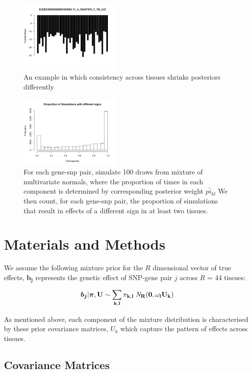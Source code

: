 \documentclass[10pt,letterpaper]{article}
\begin{document}
 \begin{figure}
\includegraphics[width=5cm]{consistent.png}
\caption{An example in which consistency across tissues shrinks posteriors differently}
\end{figure}

 \begin{figure}
\includegraphics[width=5cm]{heterogeneity distribution-1.png}
\caption{For each gene-snp pair, simulate 100 draws from mixture of multivariate normals, where the proportion of times in each component is determined by corresponding posterior weight $\tilde{pi_{kl}}$ We then count, for each gene-snp pair, the proportion of simulations that result in effects of a different sign in at least two tissues.}
\end{figure}


\section*{Materials and Methods}

We assume the following mixture prior for the $R$ dimensional vector of true effects,  $\bm{b_{j}}$ represents the genetic effect of SNP-gene pair $j$ across $R$ = 44 tissues:

 \begin{equation}
  \bm{b_{j}} | \bm{\pi},\bf{U} \sim \sum_{k,l} \pi_{k,l} \;{\it N}_R(\bm{0}, \omega_l U_{k})
\end{equation}


As mentioned above, each component of the mixture distribution is characterised by these prior covariance matrices, $U_{k}$ which capture the pattern of effects across tissues.
\subsection{ Covariance Matrices}
\end{document}
